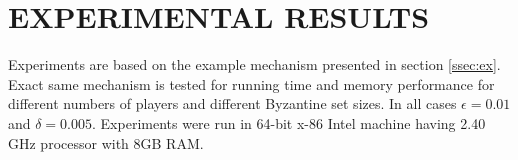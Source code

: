 \section{EXPERIMENTAL RESULTS}
Experiments are based on the example mechanism presented in section \ref{ssec:ex}. Exact same mechanism is tested for running time and memory performance for different numbers of players and different Byzantine set sizes. In all cases $\epsilon=0.01$ and $\delta=0.005$. Experiments were run in 64-bit x-86 Intel machine having 2.40 GHz processor with 8GB RAM.

\begin{table}[H]
	\centering
	\caption{Experimental Results }
	\label{my-label}
\end{table}